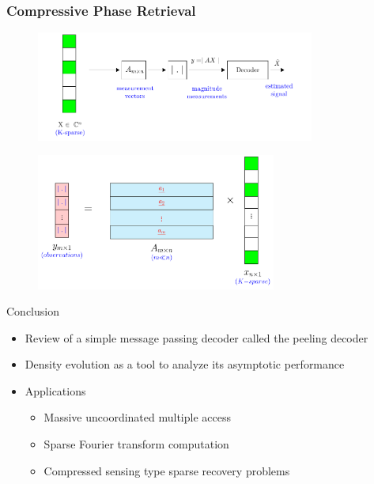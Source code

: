 \begin{frame} \frametitle{Compressive Phase Retrieval}



\begin{figure}[t]
\centering
\includegraphics[width=3.6in]{./Figures/phase_retrieval.pdf}
\end{figure}

\pause		
\vspace{-.25in}
\begin{figure}[t]
\centering
\includegraphics[width=3.1in]{./Figures/A_times_X_phase_retrieval.pdf}
\end{figure}
\end{frame}	
\begin{frame}{Conclusion}
\begin{itemize}
  \item Review of a simple message passing decoder called the peeling decoder
  \item Density evolution as a tool to analyze its asymptotic performance
  \item Applications 
    \begin{itemize}
      \item Massive uncoordinated multiple access
      \item Sparse Fourier transform computation
      \item Compressed sensing type sparse recovery problems
    \end{itemize}
\end{itemize}
\end{frame}
	